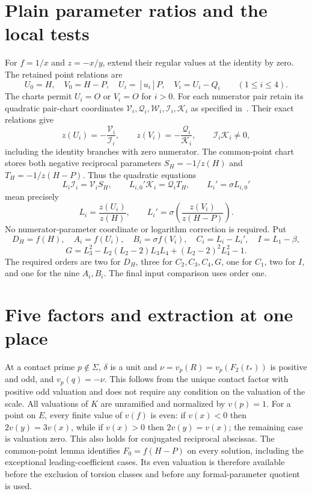 \documentclass[11pt,a4paper]{article}
\begin{document}
\section{Plain parameter ratios and the local tests}
For $f=1/x$ and $z=-x/y$, extend their regular values at the
identity by zero. The retained point relations are
\[
 U_0=H,\quad V_0=H-P,\quad U_i=[u_i]P,\quad V_i=U_i-Q_i
 \qquad(1\le i\le4).
\]
The charts permit $U_i=O$ or $V_i=O$ for $i>0$.
For each numerator pair retain its quadratic pair-chart coordinates
$\mathcal V_i,\mathcal Q_i,\mathcal W_i,\mathcal I_i,\mathcal K_i$
as specified in~\cite{Even}. Their exact relations give
\[
 z(U_i)=-\frac{\mathcal V_i}{\mathcal I_i},\qquad
 z(V_i)=-\frac{\mathcal Q_i}{\mathcal K_i},\qquad
 \mathcal I_i\mathcal K_i\ne0,
\]
including the identity branches with zero numerator.
The common-point chart stores both negative reciprocal parameters
$S_H=-1/z(H)$ and $T_H=-1/z(H-P)$. Thus the quadratic equations
\[
 L_i\mathcal I_i=\mathcal V_iS_H,\qquad
 L_{i,0}'\mathcal K_i=\mathcal Q_iT_H,\qquad
 L_i'=\sigma L_{i,0}'
\]
mean precisely
\[
 L_i=\frac{z(U_i)}{z(H)},\qquad
 L_i'=\sigma\!\left(\frac{z(V_i)}{z(H-P)}\right).
\]
No numerator-parameter coordinate or logarithm correction is required.
Put
\[
 D_H=f(H),\quad A_i=f(U_i),\quad B_i=\sigma f(V_i),\quad
 C_i=L_i-L_i',\quad I=L_1-\beta,
\]
\[
 G=L_3^2-L_2(L_2-2)L_3L_4+(L_2-2)^2L_4^2-1.
\]
The required orders are two for $D_H$, three for $C_2,C_3,C_4,G$,
one for $C_1$, two for $I$, and one for the nine $A_i,B_i$.
The final input comparison uses order one.

\section{Five factors and extraction at one place}
At a contact prime $p\notin\Sigma$, $\delta$ is a unit and
$\nu=v_p(R)=v_p(F_2(t_*))$ is positive and odd, and $v_p(q)=-\nu$. This follows
from the unique contact factor with positive odd valuation and
does not require any condition on the valuation of the scale. All valuations
of $K$ are unramified and normalized by $v(p)=1$.
For a point on $E$, every finite value of $v(f)$ is even: if
$v(x)<0$ then $2v(y)=3v(x)$, while if $v(x)>0$ then
$2v(y)=v(x)$; the remaining case is valuation zero.
This also holds for conjugated reciprocal abscissas. The common-point lemma identifies $F_0=f(H-P)$ on every solution,
including the exceptional leading-coefficient cases. Its even valuation
is therefore available before the exclusion of torsion classes and
before any formal-parameter quotient is used.
\end{document}
